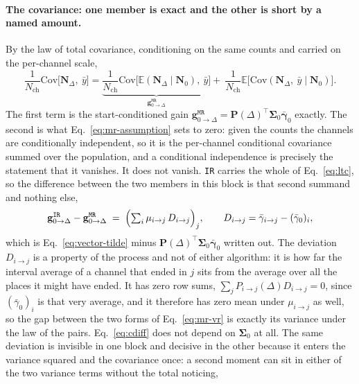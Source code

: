 \begin{appendixbox}
\paragraph{The covariance: one member is exact and the other is short by a named amount.}
By the law of total covariance, conditioning on the same counts and carried on the per-channel
scale,
\begin{equation}
  \frac{1}{N_{\mathrm{ch}}}\mathrm{Cov}\bigl[\mathbf{N}_\Delta,\ \bar y\bigr]
  = \underbrace{\frac{1}{N_{\mathrm{ch}}}\mathrm{Cov}\bigl[\mathbb{E}(\mathbf{N}_\Delta\mid \mathbf{N}_0),\ \bar y\bigr]}_{\textstyle \mathbf{g}^{\mathtt{MR}}_{0\to\Delta}}
  + \ \frac{1}{N_{\mathrm{ch}}}\mathbb{E}\bigl[\mathrm{Cov}(\mathbf{N}_\Delta,\ \bar y \mid \mathbf{N}_0)\bigr] .
  \label{eq:ltc}
\end{equation}
The first term is the start-conditioned gain
$\mathbf{g}^{\mathtt{MR}}_{0\to\Delta}=\mathbf{P}(\Delta)^\top\bm{\Sigma}_0\bar{\bm{\gamma}}_0$ exactly. The
second is what Eq.~\ref{eq:mr-assumption} sets to zero: given the counts the channels are
conditionally independent, so it is the per-channel conditional covariance summed over the
population, and a conditional independence is precisely the statement that it vanishes. It does not
vanish. \texttt{IR} carries the whole of Eq.~\ref{eq:ltc}, so the difference between the two
members in this block is that second summand and nothing else,
\begin{equation}
  \mathbf{g}^{\mathtt{IR}}_{0\to\Delta}-\mathbf{g}^{\mathtt{MR}}_{0\to\Delta}
  \;=\;\Bigl(\textstyle\sum_{i}\mu_{i\to j}\,D_{i\to j}\Bigr)_{j},
  \qquad
  D_{i\to j}=\bar{\gamma}_{i\to j}-(\bar\gamma_0)_{i} ,
  \label{eq:cdiff}
\end{equation}
which is Eq.~\ref{eq:vector-tilde} minus $\mathbf{P}(\Delta)^\top\bm{\Sigma}_0\bar{\bm{\gamma}}_0$
written out. The deviation $D_{i\to j}$ is a property of the process and not of either
algorithm: it is how far the interval average of a channel that ended in $j$ sits from the
average over all the places it might have ended. It has zero row sums,
$\sum_{j}P_{i\to j}(\Delta)D_{i\to j}=0$, since $(\bar\gamma_0)_{i}$ is that very
average, and it therefore has zero mean under $\mu_{i\to j}$ as well, so the gap between the
two forms of Eq.~\ref{eq:mr-vr} is exactly its variance under the law of the pairs.
Eq.~\ref{eq:cdiff} does not depend on $\bm{\Sigma}_0$ at all. The same deviation is invisible in
one block and decisive in the other because it enters the variance squared and the covariance
once: a second moment can sit in either of the two variance terms without the total noticing,

\end{appendixbox}
